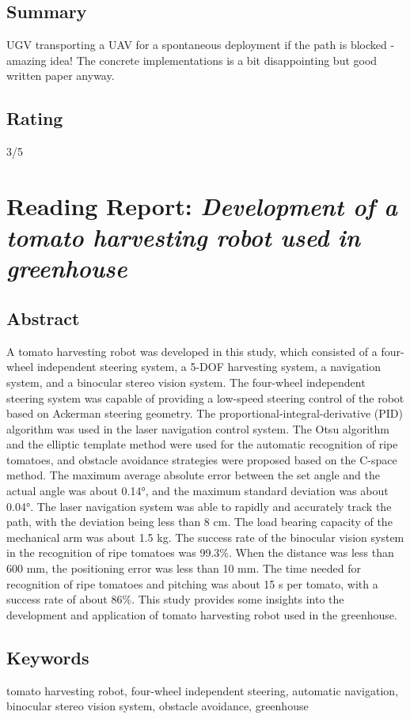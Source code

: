 \documentclass{article}
\begin{document}
\subsection*{Summary}
UGV transporting a UAV for a spontaneous deployment if the path is blocked - amazing idea! The concrete implementations is a bit disappointing but good written paper anyway.

\subsection*{Rating}
3/5

\section{Reading Report: \emph{Development of a tomato harvesting robot used in greenhouse}}
\cite{Lili2017}

\subsection*{Abstract}
A tomato harvesting robot was developed in this study, which consisted of a four-wheel independent steering system,
a 5-DOF harvesting system, a navigation system, and a binocular stereo vision system.
The four-wheel independent steering system was capable of providing a low-speed steering control of the robot based on Ackerman steering geometry.
The proportional-integral-derivative (PID) algorithm was used in the laser navigation control system. The Otsu algorithm and the
elliptic template method were used for the automatic recognition of ripe tomatoes, and obstacle avoidance strategies were
proposed based on the C-space method. The maximum average absolute error between the set angle and the actual angle was
about 0.14°, and the maximum standard deviation was about 0.04°.  The laser navigation system was able to rapidly and
accurately track the path, with the deviation being less than 8 cm.  The load bearing capacity of the mechanical arm was about
1.5 kg. The success rate of the binocular vision system in the recognition of ripe tomatoes was 99.3\%.
When the distance was less than 600 mm, the positioning error was less than 10 mm.
The time needed for recognition of ripe tomatoes and pitching was about 15 s per tomato, with a success rate of about 86\%. 
This study provides some insights into the development and application of tomato harvesting robot used in the greenhouse.


\subsection*{Keywords}
tomato harvesting robot, four-wheel independent steering, automatic navigation, binocular stereo vision system,
obstacle avoidance, greenhouse
\end{document}
